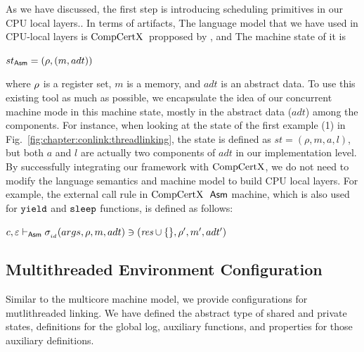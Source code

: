 As we have discussed,
the first step is introducing scheduling primitives in our CPU local layers..
In terms of artifacts, 
The language model that we have used in CPU-local layers is $\mathrm{CompCertX}$\ propposed by \cite{deepspec}, and 
The machine state of it is
\begin{center}
$st_{\mathsf{Asm}} = (\rho, (m, adt))$
\end{center}
where $\rho$ is a register set, $m$ is a memory, and $adt$ is an abstract data.
To use this existing tool as much as possible, we encapsulate the idea of 
our concurrent machine mode in this machine state, 
mostly in the abstract data ($adt$) among the components.
For instance, when looking at the state of the first example (1) in Fig.~\ref{fig:chapter:conlink:threadlinking}, the state is defined as $st = (\rho, m, a, l)$, but both $a$ and $l$ are actually two components of $adt$ in our implementation level.
By successfully integrating our framework with $\mathrm{CompCertX}$, we do not need to modify the language semantics and machine model
to build CPU local layers.
For example, the external call rule in $\mathrm{CompCertX}$\ $\mathsf{Asm}$ machine, 
which is also used for ${\mathrm{\texttt{yield}}}$ and ${\mathrm{\texttt{sleep}}}$ functions,  
is defined as follows:
\begin{center}
$c, {\varepsilon} \vdash_{\mathsf{Asm}} \sigma_{_{id}}(args, \rho, m, adt) \ni (\textit{res}\cup \{\}, \rho',  m', adt')$
\end{center}

\subsection{Multithreaded Environment Configuration}
\label{chapter:linking:subsec:multithreaded-env-configuration}

Similar to the multicore machine model, we provide configurations 
for mutlithreaded linking. 
We have defined the abstract type of 
shared and private states, 
definitions for the global log, 
auxiliary functions,
and properties for those auxiliary definitions. 

